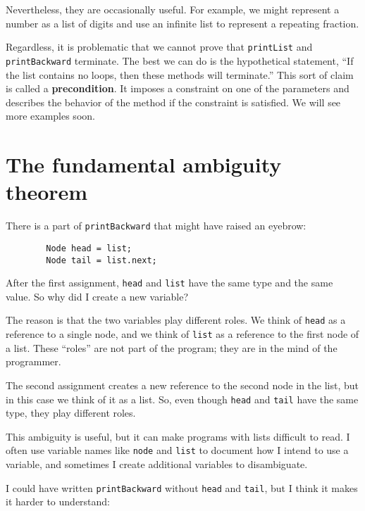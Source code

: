 Nevertheless, they are occasionally useful.  For example, we
might represent a number as a list of digits and use an infinite
list to represent a repeating fraction.

Regardless, it is problematic that we cannot prove that {\tt printList}
and {\tt printBackward} terminate.  The best we can do is the
hypothetical statement, ``If the list contains no loops, then these
methods will terminate.''  This sort of claim is called a {\bf
precondition}.  It imposes a constraint on one of the parameters and
describes the behavior of the method if the constraint is satisfied.
We will see more examples soon.


\section{The fundamental ambiguity theorem}

There is a part of {\tt printBackward} that might have raised
an eyebrow:

\begin{verbatim}
        Node head = list;
        Node tail = list.next;
\end{verbatim}
%
After the first assignment, {\tt head} and {\tt list} have the same
type and the same value.  So why did I create a new variable?

The reason is that the two variables play different roles.  We think
of {\tt head} as a reference to a single node, and we think of
{\tt list} as a reference to the first node of a list.  These
``roles'' are not part of the program; they are in the mind of the
programmer.


The second assignment creates a new reference to the second node
in the list, but in this case we think of it as a list.
So, even though {\tt head} and {\tt tail} have the same
type, they play different roles.

This ambiguity is useful, but it can make programs with lists
difficult to read.  I often use variable names like {\tt node}
and {\tt list} to document how I intend to use a variable, and
sometimes I create additional variables to disambiguate.

I could have written {\tt printBackward} without {\tt head}
and {\tt tail}, but I think it makes it harder to understand:

